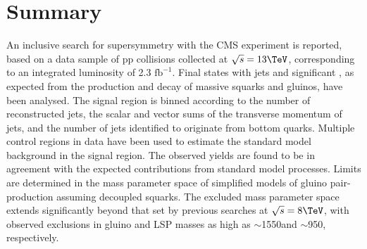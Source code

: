 \clearpage
\section{Summary}
\label{sec:summary}

An inclusive search for supersymmetry with the CMS experiment is
reported, based on a data sample of pp collisions collected at
$\sqrt{s} = 13\TeV$, corresponding to an integrated luminosity of 2.3 $\mathrm{fb}^{-1}$. 
Final states with jets and significant \ETmiss, as
expected from the production and decay of massive squarks and gluinos,
have been analysed. The signal region is binned according to the
number of reconstructed jets, the scalar and vector sums of the
transverse momentum of jets, and the number of jets identified to
originate from bottom quarks. 
Multiple control regions in data have been used to estimate the standard model background in 
the signal region. 
The observed yields are found to be in agreement with the
expected contributions from standard model processes. Limits are
determined in the mass parameter space of simplified models of gluino
pair-production assuming decoupled squarks. The excluded mass
parameter space extends significantly beyond that set by previous
searches at $\sqrt{s} = 8\TeV$, with observed exclusions in gluino and
LSP masses as high as $\sim$1550\gev and $\sim$950\gev, respectively.

